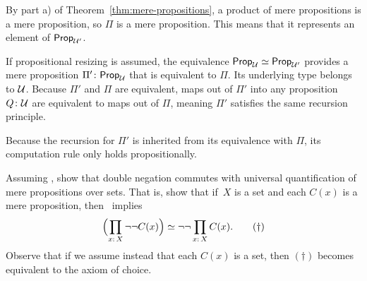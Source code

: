 \begin{solution}
\begin{enumerate}[a)]
        By part a) of Theorem~\ref{thm:mere-propositions}, a product of mere propositions is a mere proposition, so $\Pi$ is a mere proposition. This means that it represents an element of $\mathsf{Prop}_{\mathcal U'}$. 
        
        If propositional resizing is assumed, the equivalence $\mathsf{Prop}_{\mathcal U}\simeq\mathsf{Prop}_{\mathcal U'}$ provides a mere proposition $\Pi'\colon\fun{Prop}_{\univ}$ that is equivalent to $\Pi$. Its underlying type belongs to $\mathcal U$. Because $\Pi'$ and $\Pi$ are equivalent, maps out of $\Pi'$ into any proposition $Q\colon\univ$ are equivalent to maps out of $\Pi$, meaning $\Pi'$ satisfies the same recursion principle.
        
        Because the recursion for $\Pi'$ is inherited from its equivalence with $\Pi$, its computation rule only holds propositionally.
        
    \end{enumerate}

\end{solution}    


\begin{exr}\fe
    Assuming \Lem, show that double negation commutes with universal quantification of mere propositions over sets. That is, show that if~$X$ is a set and each $C(x)$ is a mere proposition, then \Lem\ implies
    \[
        \Bigl(
            \prod_{x\colon X}\neg\neg C(x)
        \Bigr)
        \simeq
        \neg\neg\prod_{x\colon X}C(x). \tag{$\dag$}
    \]
    Observe that if we assume instead that each $C(x)$ is a set, then $(\dag)$ becomes equivalent to the axiom of choice.
\end{exr}

